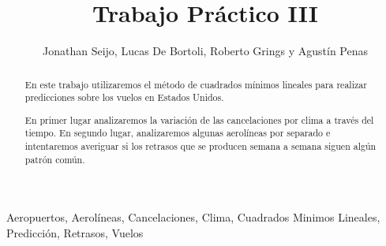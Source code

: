 \documentclass{endm}
\begin{document}
\setlength{\abovedisplayskip}{1cm}
\setlength{\belowdisplayskip}{1cm}

\begin{frontmatter}


\title{Trabajo Práctico III}

\author{Jonathan Seijo, Lucas De Bortoli, Roberto Grings y Agustín Penas}
\address{Departamento de computación\\ Universidad de Buenos Aires\\ Buenos Aires, Argentina\\}


\begin{abstract}

En este trabajo utilizaremos el método de cuadrados mínimos lineales para realizar predicciones sobre los vuelos en Estados Unidos.

En primer lugar analizaremos la variación de las cancelaciones por clima a través del tiempo. En segundo lugar, analizaremos algunas aerolíneas por separado e intentaremos averiguar si los retrasos que se producen semana a semana siguen algún patrón común.
\end{abstract}

\begin{keyword}
Aeropuertos, Aerolíneas, Cancelaciones, Clima, Cuadrados Minimos Lineales, Predicción, Retrasos, Vuelos
\end{keyword}

\end{frontmatter}

\newpage



\end{document}
